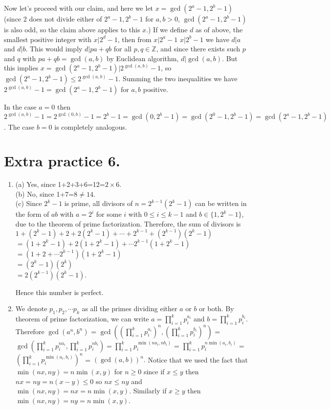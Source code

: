 \documentclass[11pt]{article}
\begin{document}
\begin{enumerate}
Now let's proceed with our claim, and here we let $x=\gcd (2^a-1, 2^b-1)$ (since 2 does not divide either of $2^a-1, 2^b-1$ for $a,b>0$, $\gcd (2^a-1, 2^b-1)$ is also odd, so the claim above applies to this $x$.) If we define $d$ as of above, the smallest positive integer with $x|2^d-1$, then from $x|2^a-1$ $x|2^b-1$ we have $d|a$ and $d|b$. This would imply $d|pa+qb$ for all $p,q\in\mathbb{Z}$, and since there exists such $p$ and $q$ with $pa+qb=\gcd (a,b)$ by Euclidean algorithm, $d|\gcd (a,b)$. But this implies $x=\gcd (2^a-1, 2^b-1)|2^{\gcd (a,b)}-1$, so $\gcd (2^a-1, 2^b-1)\le 2^{\gcd (a,b)}-1$. Summing the two inequalities we have $2^{\gcd (a,b)}-1= \gcd (2^a-1, 2^b-1)$ for $a,b$ positive.

In the case $a=0$ then $2^{\gcd (a,b)}-1=2^{\gcd (0,b)}-1=2^b-1=\gcd (0, 2^b-1)=\gcd (2^0-1, 2^b-1)=\gcd (2^a-1, 2^b-1)$. The case $b=0$ is completely analogous.

\end{enumerate}

\section {Extra practice 6.}
\begin{enumerate}
\item (a) Yes, since 1+2+3+6=12=$2\times 6$.\\
(b) No, since 1+7=8$\neq 14$.\\
(c) Since $2^k-1$ is prime, all divisors of $n=2^{k-1}(2^k-1)$ can be written in the form of $ab$ with $a=2^i$ for some $i$ with $0\le i\le k-1$ and $b\in\{1, 2^k-1\}$, due to the theorem of prime factorization. Therefore, the sum of divisors is\\ $1+(2^k-1)+2+2(2^k-1)+\cdots + 2^{k-1}+(2^{k-1})(2^k-1)$\\
$=(1+2^k-1)+2(1+2^k-1)+\cdots 2^{k-1}(1+2^k-1)$\\
$=(1+2+\cdots 2^{k-1})(1+2^k-1)$\\
$=(2^k-1)(2^k)$\\
$=2(2^{k-1})(2^k-1)$.

Hence this number is perfect.

\item We denote $p_1, p_2,\cdots p_k$ as all the primes dividing either $a$ or $b$ or both. By theorem of prime factorization, we can write $a=\displaystyle\prod_{i=1}^{k} p_i^{a_i}$ and $b=\displaystyle\prod_{i=1}^{k} p_i^{b_i}$. Therefore $\gcd (a^n, b^n)$ = $\gcd ((\displaystyle\prod_{i=1}^{k} p_i^{a_i})^n, (\displaystyle\prod_{i=1}^{k} p_i^{b_i})^n)$ = $\gcd (\displaystyle\prod_{i=1}^{k} p_i^{na_i}, \displaystyle\prod_{i=1}^{k} p_i^{nb_i}) = \displaystyle\prod_{i=1}^{k} p_i^{\min (na_i, nb_i)}$ = $\displaystyle\prod_{i=1}^{k} p_i^{n\min (a_i, b_i)}$ = $(\displaystyle\prod_{i=1}^{k} p_i^{\min (a_i, b_i)})^n$ = $(\gcd (a,b))^n.$ Notice that we used the fact that $\min (nx, ny)=n\min (x,y)$ for $n\ge 0$ since if $x\le y$ then $nx=ny=n(x-y)\le 0$ so $nx\le ny$ and $\min (nx, ny)=nx=n\min (x,y)$. Similarly if $x\ge y$ then $\min (nx, ny)=ny=n\min (x,y)$.
\end{enumerate}
\end{document}
